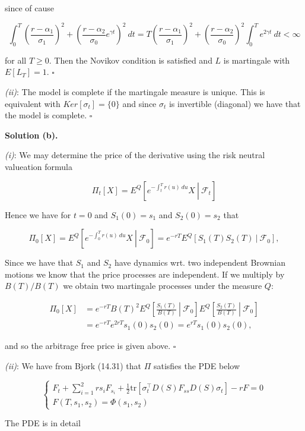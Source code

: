\documentclass[
]{article}
\begin{document}
since of cause

\[
\int_0^T(\frac{r-\alpha_1}{\sigma_1})^2+(\frac{r-\alpha_2}{\sigma_0}e^{\gamma t})^2\ dt=T(\frac{r-\alpha_1}{\sigma_1})^2+(\frac{r-\alpha_2}{\sigma_0})^2\int_0^Te^{2\gamma t}\ dt<\infty
\]

for all \(T\ge 0\). Then the Novikov condition is satisfied and \(L\) is
martingale with \(E[L_T]=1\). \(\square\)

\emph{(ii)}: The model is complete if the martingale measure is unique.
This is equivalent with \(Ker[\sigma_t]=\{0\}\) and since \(\sigma_t\)
is invertible (diagonal) we have that the model is complete. \(\square\)

\textbf{Solution (b).}

\emph{(i)}: We may determine the price of the derivative using the risk
neutral valueation formula

\[
\Pi_t[X]=E^Q\left[\left.e^{-\int_t^Tr(u)\ du}X\ \right\vert\ \mathcal{F}_t\right]
\]

Hence we have for \(t=0\) and \(S_1(0)=s_1\) and \(S_2(0)=s_2\) that

\[
\Pi_0[X]=E^Q\left[\left.e^{-\int_0^Tr(u)\ du}X\ \right\vert\ \mathcal{F}_0\right]=e^{-rT}E^Q\left[\left. S_1(T)S_2(T)\ \right\vert\ \mathcal{F}_0\right],
\]

Since we have that \(S_1\) and \(S_2\) have dynamics wrt. two
independent Brownian motions we know that the price processes are
independent. If we multiply by \(B(T)/B(T)\) we obtain two martingale
processes under the measure \(Q\):

\begin{align*}
\Pi_0[X]&=e^{-rT}B(T)^2E^Q\left[\left. \frac{S_1(T)}{B(T)}\ \right\vert\ \mathcal{F}_0\right]E^Q\left[\left. \frac{S_2(T)}{B(T)}\ \right\vert\ \mathcal{F}_0\right]\\
&=e^{-rT}e^{2rT}s_1(0)s_2(0)=e^{rT}s_1(0)s_2(0),
\end{align*}

and so the arbitrage free price is given above. \(\square\)

\emph{(ii)}: We have from Bjork (14.31) that \(\Pi\) satisfies the PDE
below

\[
\begin{cases}
F_t+\sum_{i=1}^2rs_iF_{s_i}+\frac{1}{2}\text{tr}[\sigma_t^\top D(S)F_{ss}D(S)\sigma_t]-rF=0\\
F(T,s_1,s_2)=\Phi(s_1,s_2)
\end{cases}
\]

The PDE is in detail
\end{document}
